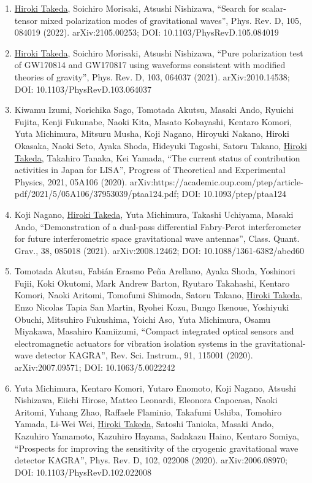 \documentclass[uplatex, 11pt]{jsarticle}
\begin{document}
\begin{enumerate}
\item \uline{Hiroki Takeda}, Soichiro Morisaki, Atsushi Nishizawa, “Search for scalar-tensor mixed polarization modes of gravitational waves”, Phys. Rev. D, 105, 084019 (2022). arXiv:2105.00253; DOI: 10.1103/PhysRevD.105.084019
\item \uline{Hiroki Takeda}, Soichiro Morisaki, Atsushi Nishizawa, “Pure polarization test of GW170814 and GW170817 using waveforms consistent with modified theories of gravity”, Phys. Rev. D, 103, 064037 (2021). arXiv:2010.14538; DOI: 10.1103/PhysRevD.103.064037
\item Kiwamu Izumi, Norichika Sago, Tomotada Akutsu, Masaki Ando, Ryuichi Fujita, Kenji Fukunabe, Naoki Kita, Masato Kobayashi, Kentaro Komori, Yuta Michimura, Mitsuru Musha, Koji Nagano, Hiroyuki Nakano, Hiroki Okasaka, Naoki Seto, Ayaka Shoda, Hideyuki Tagoshi, Satoru Takano, \uline{Hiroki Takeda}, Takahiro Tanaka, Kei Yamada, “The current status of contribution activities in Japan for LISA”, Progress of Theoretical and Experimental Physics, 2021, 05A106 (2020). arXiv:https://academic.oup.com/ptep/article-pdf/2021/5/05A106/37953039/ptaa124.pdf; DOI: 10.1093/ptep/ptaa124
\item Koji Nagano, \uline{Hiroki Takeda}, Yuta Michimura, Takashi Uchiyama, Masaki Ando, “Demonstration of a dual-pass differential Fabry-Perot interferometer for future interferometric space gravitational wave antennas”, Class. Quant. Grav., 38, 085018 (2021). arXiv:2008.12462; DOI: 10.1088/1361-6382/abed60
\item Tomotada Akutsu, Fabián Erasmo Peña Arellano, Ayaka Shoda, Yoshinori Fujii, Koki Okutomi, Mark Andrew Barton, Ryutaro Takahashi, Kentaro Komori, Naoki Aritomi, Tomofumi Shimoda, Satoru Takano, \uline{Hiroki Takeda}, Enzo Nicolas Tapia San Martin, Ryohei Kozu, Bungo Ikenoue, Yoshiyuki Obuchi, Mitsuhiro Fukushima, Yoichi Aso, Yuta Michimura, Osamu Miyakawa, Masahiro Kamiizumi, “Compact integrated optical sensors and electromagnetic actuators for vibration isolation systems in the gravitational-wave detector KAGRA”, Rev. Sci. Instrum., 91, 115001 (2020). arXiv:2007.09571; DOI: 10.1063/5.0022242
\item Yuta Michimura, Kentaro Komori, Yutaro Enomoto, Koji Nagano, Atsushi Nishizawa, Eiichi Hirose, Matteo Leonardi, Eleonora Capocasa, Naoki Aritomi, Yuhang Zhao, Raffaele Flaminio, Takafumi Ushiba, Tomohiro Yamada, Li-Wei Wei, \uline{Hiroki Takeda}, Satoshi Tanioka, Masaki Ando, Kazuhiro Yamamoto, Kazuhiro Hayama, Sadakazu Haino, Kentaro Somiya, “Prospects for improving the sensitivity of the cryogenic gravitational wave detector KAGRA”, Phys. Rev. D, 102, 022008 (2020). arXiv:2006.08970; DOI: 10.1103/PhysRevD.102.022008

\end{enumerate}
\end{document}
